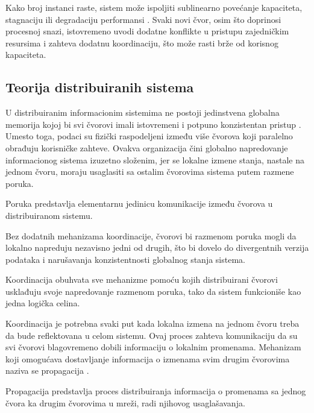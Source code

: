 Kako broj instanci raste, sistem može ispoljiti sublinearno povećanje kapaciteta, stagnaciju ili degradaciju performansi \cite{hamann2021scalability}. Svaki novi čvor, osim što doprinosi procesnoj snazi, istovremeno uvodi dodatne konflikte u pristupu zajedničkim resursima i zahteva dodatnu koordinaciju, što može rasti brže od korisnog kapaciteta.

\subsection{Teorija distribuiranih sistema}
U distribuiranim informacionim sistemima ne postoji jedinstvena globalna memorija kojoj bi svi čvorovi imali istovremeni i potpuno konzistentan pristup \cite{kleppmann2017designing}. Umesto toga, podaci su fizički raspodeljeni između više čvorova koji paralelno obrađuju korisničke zahteve. Ovakva organizacija čini globalno napredovanje informacionog sistema izuzetno složenim, jer se lokalne izmene stanja, nastale na jednom čvoru, moraju usaglasiti sa ostalim čvorovima sistema putem razmene poruka.

\begin{definicija}
Poruka predstavlja elementarnu jedinicu komunikacije između čvorova u distribuiranom sistemu.
\end{definicija}

Bez dodatnih mehanizama koordinacije, čvorovi bi razmenom poruka mogli da lokalno napreduju nezavisno jedni od drugih, što bi dovelo do divergentnih verzija podataka i narušavanja konzistentnosti globalnog stanja sistema.

\begin{definicija}
Koordinacija obuhvata sve mehanizme pomoću kojih distribuirani čvorovi usklađuju svoje napredovanje razmenom poruka, tako da sistem funkcioniše kao jedna logička celina.
\end{definicija}

Koordinacija je potrebna svaki put kada lokalna izmena na jednom čvoru treba da bude reflektovana u celom sistemu. Ovaj proces zahteva komunikaciju da su svi čvorovi blagovremeno dobili informaciju o lokalnim promenama. Mehanizam koji omogućava dostavljanje informacija o izmenama svim drugim čvorovima naziva se propagacija \cite{holliday2003epidemic}.

\begin{definicija}
Propagacija predstavlja proces distribuiranja informacija o promenama sa jednog čvora ka drugim čvorovima u mreži, radi njihovog usaglašavanja.
\end{definicija}

